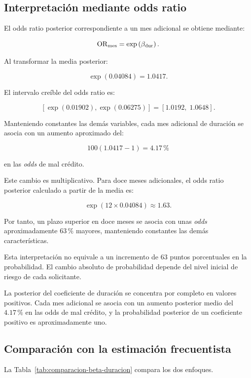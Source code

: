 \subsection{Interpretación mediante odds ratio}

El odds ratio posterior correspondiente a un mes adicional se obtiene
mediante:

\[
\mathrm{OR}_{\mathrm{mes}}
=
\exp
\left(
    \beta_{\mathrm{dur}}
\right).
\]

Al transformar la media posterior:

\[
\exp(0.04084)
=
1.0417.
\]

El intervalo creíble del odds ratio es:

\[
[
\exp(0.01902),
\exp(0.06275)
]
=
[1.0192,\;1.0648].
\]

Manteniendo constantes las demás variables, cada mes adicional de
duración se asocia con un aumento aproximado del:

\[
100(1.0417-1)
=
4.17\,\%
\]

en las \textit{odds} de mal crédito.

Este cambio es multiplicativo. Para doce meses adicionales, el odds ratio
posterior calculado a partir de la media es:

\[
\exp
\left(
    12\times0.04084
\right)
\approx
1.63.
\]

Por tanto, un plazo superior en doce meses se asocia con unas
\textit{odds} aproximadamente \(63\,\%\) mayores, manteniendo constantes
las demás características.

Esta interpretación no equivale a un incremento de \(63\) puntos
porcentuales en la probabilidad. El cambio absoluto de probabilidad
depende del nivel inicial de riesgo de cada solicitante.

\begin{hallazgo}
La posterior del coeficiente de duración se concentra por completo en
valores positivos. Cada mes adicional se asocia con un aumento posterior
medio del \(4.17\,\%\) en las odds de mal crédito, y la probabilidad
posterior de un coeficiente positivo es aproximadamente uno.
\end{hallazgo}

\subsection{Comparación con la estimación frecuentista}

La Tabla~\ref{tab:comparacion-beta-duracion} compara los dos enfoques.

